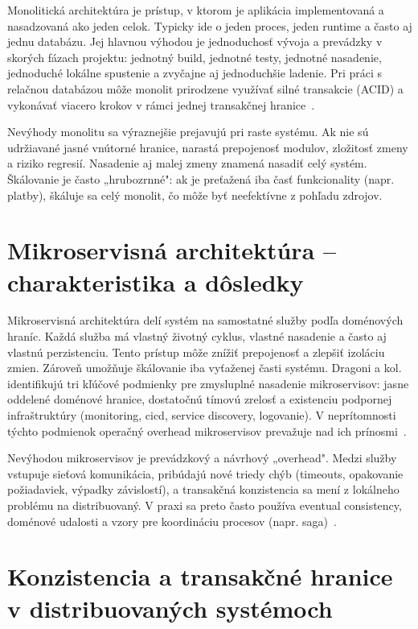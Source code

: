 Monolitická architektúra je prístup, v ktorom je aplikácia implementovaná a nasadzovaná ako jeden celok. Typicky ide o jeden proces, jeden runtime a často aj jednu databázu. Jej hlavnou výhodou je jednoduchosť vývoja a prevádzky v skorých fázach projektu: jednotný build, jednotné testy, jednotné nasadenie, jednoduché lokálne spustenie a zvyčajne aj jednoduchšie ladenie. Pri práci s relačnou databázou môže monolit prirodzene využívať silné transakcie (ACID) a vykonávať viacero krokov v rámci jednej transakčnej hranice~\cite{Fowler2015MonolithFirst}.

Nevýhody monolitu sa výraznejšie prejavujú pri raste systému. Ak nie sú udržiavané jasné vnútorné hranice, narastá prepojenosť modulov, zložitosť zmeny a riziko regresií. Nasadenie aj malej zmeny znamená nasadiť celý systém. Škálovanie je často „hrubozrnné": ak je preťažená iba časť funkcionality (napr. platby), škáluje sa celý monolit, čo môže byť neefektívne z pohľadu zdrojov.

\section{Mikroservisná architektúra – charakteristika a dôsledky}

Mikroservisná architektúra delí systém na samostatné služby podľa doménových hraníc. Každá služba má vlastný životný cyklus, vlastné nasadenie a často aj vlastnú perzistenciu. Tento prístup môže znížiť prepojenosť a zlepšiť izoláciu zmien. Zároveň umožňuje škálovanie iba vyťaženej časti systému. Dragoni a kol.~\cite{Dragoni2017} identifikujú tri kľúčové podmienky pre zmysluplné nasadenie mikroservisov: jasne oddelené doménové hranice, dostatočnú tímovú zrelosť a existenciu podpornej infraštruktúry (monitoring, \gls{cicd}, service discovery, logovanie). V neprítomnosti týchto podmienok operačný overhead mikroservisov prevažuje nad ich prínosmi~\cite{Newman2021,Richardson2018,Richardson2020,FowlerLewis2014MicroservicesDefinition}.

Nevýhodou mikroservisov je prevádzkový a návrhový „overhead". Medzi služby vstupuje sieťová komunikácia, pribúdajú nové triedy chýb (timeouts, opakovanie požiadaviek, výpadky závislostí), a transakčná konzistencia sa mení z lokálneho problému na distribuovaný. V praxi sa preto často používa eventual consistency, doménové udalosti a vzory pre koordináciu procesov (napr. saga)~\cite{Richardson2018,Vogels2009}.

\section{Konzistencia a transakčné hranice v distribuovaných systémoch}

